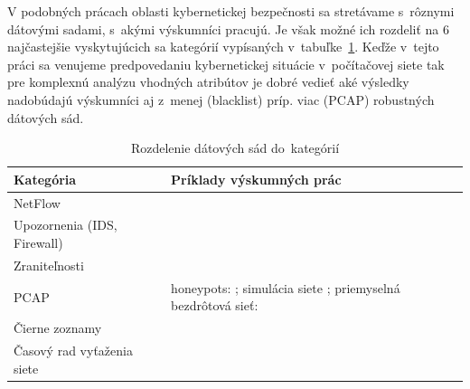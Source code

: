 \documentclass[thesismargins, thesislinespacing, openright, upjsfrontpage]{rnthesis}
\begin{document}

V podobných prácach oblasti kybernetickej bezpečnosti sa stretávame s~rôznymi dátovými sadami, s~akými výskumníci pracujú. Je však možné ich rozdeliť na 6 najčastejšie vyskytujúcich sa kategórií vypísaných v~tabuľke~\ref{tab:c1_datasets}. Keďže v~tejto práci sa venujeme predpovedaniu kybernetickej situácie v~počítačovej siete tak pre komplexnú analýzu vhodných atribútov je dobré vedieť aké výsledky nadobúdajú výskumníci aj z~menej (blacklist) príp. viac (PCAP) robustných dátových sád.

\begin{table}[]
    \centering
    \begin{tabular}{ | p{5cm} | p{9cm} | }
         \hline \textbf{Kategória} & \textbf{Príklady výskumných prác} \\
         \hline
         \hline NetFlow & \cite{zang2019adaptive,fang2019deep,millar2019using,bakhshi2015user,jakalan2015profiling,marchette1999statistical,bernaille2006traffic,jirsik2020cyber} \\
         \hline Upozornenia \newline (IDS, Firewall) & \cite{granat2019big,werner2017time,shin2013advanced,ramaki2015real,soldo2011blacklisting} \\
         \hline Zraniteľnosti & \cite{tang2016exploiting,condon2008analysis,roumani2015time,tang2018disclosure,tang2017big,pokhrel2017cybersecurity} \\
         \hline PCAP & honeypots: \cite{zhan2015predicting,berti2017profiling,hammerschmidt2016efficient}; \newline simulácia siete \cite{jiang2004detecting}; \newline priemyselná bezdrôtová sieť: \cite{wei2012intrusion}  \\
         \hline Čierne zoznamy & \cite{liu2015cloudy} \\
         \hline Časový rad vyťaženia siete & \cite{cortez2012multi,hasegawa2001applications,papagiannaki2005long,sang2002predictability,wang2008internet} \\
         \hline
    \end{tabular}
    \caption{Rozdelenie dátových sád do~kategórií}
    \label{tab:c1_datasets}
\end{table}
\end{document}
